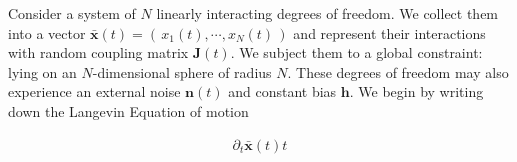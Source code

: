 Consider a system of $N$ linearly interacting degrees of freedom. We collect them into a vector $\mathbf{\bar x}(t) = \left(\,x_1(t),\cdots, x_N(t)\,\right)$ and represent their interactions with random coupling matrix $\mathbf{J}(t)$. We subject them to a global constraint: lying on an $N$-dimensional sphere of radius $N$. These degrees of freedom may also experience an external noise $\mathbf{n}(t)$ and constant bias $\mathbf{h}$. We begin by writing down the Langevin Equation of motion

\begin{align}
\partial_t\mathbf{\bar x}(t)t
\end{align}